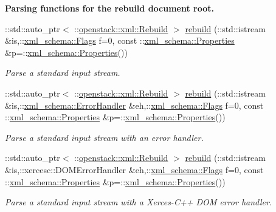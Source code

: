 \begin{Indent}{\bf Parsing functions for the rebuild document root.}
\begin{DoxyCompactItemize}
::std::auto\_\-ptr$<$ ::\hyperlink{classopenstack_1_1xml_1_1Rebuild}{openstack::xml::Rebuild} $>$ \hyperlink{namespaceopenstack_1_1xml_ab41069c4f787d60c375a6a6ff1fbe158}{rebuild} (::std::istream \&is,::\hyperlink{namespacexml__schema_affb4c227cbd9aa7453dd1dc5a1401943}{xml\_\-schema::Flags} f=0, const ::\hyperlink{namespacexml__schema_ad27ce19a7ee1d3b1064092648898f64c}{xml\_\-schema::Properties} \&p=::\hyperlink{namespacexml__schema_ad27ce19a7ee1d3b1064092648898f64c}{xml\_\-schema::Properties}())
\begin{DoxyCompactList}\small\item\em Parse a standard input stream. \item\end{DoxyCompactList}\item 
::std::auto\_\-ptr$<$ ::\hyperlink{classopenstack_1_1xml_1_1Rebuild}{openstack::xml::Rebuild} $>$ \hyperlink{namespaceopenstack_1_1xml_a9dd6579b5f8ae5f78a34592eba0a5e96}{rebuild} (::std::istream \&is,::\hyperlink{namespacexml__schema_ab1c9361bfd3b404eaabf0c31eded79dc}{xml\_\-schema::ErrorHandler} \&eh,::\hyperlink{namespacexml__schema_affb4c227cbd9aa7453dd1dc5a1401943}{xml\_\-schema::Flags} f=0, const ::\hyperlink{namespacexml__schema_ad27ce19a7ee1d3b1064092648898f64c}{xml\_\-schema::Properties} \&p=::\hyperlink{namespacexml__schema_ad27ce19a7ee1d3b1064092648898f64c}{xml\_\-schema::Properties}())
\begin{DoxyCompactList}\small\item\em Parse a standard input stream with an error handler. \item\end{DoxyCompactList}\item 
::std::auto\_\-ptr$<$ ::\hyperlink{classopenstack_1_1xml_1_1Rebuild}{openstack::xml::Rebuild} $>$ \hyperlink{namespaceopenstack_1_1xml_a6a3bbb7026802bfcfd861b34b3dc41f1}{rebuild} (::std::istream \&is,::xercesc::DOMErrorHandler \&eh,::\hyperlink{namespacexml__schema_affb4c227cbd9aa7453dd1dc5a1401943}{xml\_\-schema::Flags} f=0, const ::\hyperlink{namespacexml__schema_ad27ce19a7ee1d3b1064092648898f64c}{xml\_\-schema::Properties} \&p=::\hyperlink{namespacexml__schema_ad27ce19a7ee1d3b1064092648898f64c}{xml\_\-schema::Properties}())
\begin{DoxyCompactList}\small\item\em Parse a standard input stream with a Xerces-\/C++ DOM error handler. \item\end{DoxyCompactList}\item 

\end{DoxyCompactItemize}
\end{Indent}
